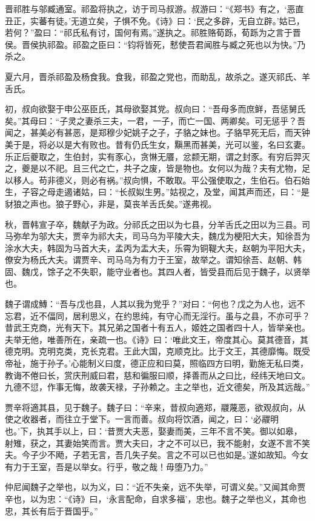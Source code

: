\documentclass[a4paper,12pt,UTF8,twoside]{ctexbook}
\begin{document}
晋祁胜与邬臧通室。祁盈将执之，访于司马叔游。叔游曰：“《郑书》有之，‘恶直丑正，实蕃有徒。’无道立矣，子惧不免。《诗》曰：‘民之多辟，无自立辟。’姑已，若何？”盈曰：“祁氏私有讨，国何有焉。”遂执之。祁胜赂荀跞，荀跞为之言于晋侯。晋侯执祁盈。祁盈之臣曰：“钧将皆死，慭使吾君闻胜与臧之死也以为快。”乃杀之。

夏六月，晋杀祁盈及杨食我。食我，祁盈之党也，而助乱，故杀之。遂灭祁氏、羊舌氏。

初，叔向欲娶于申公巫臣氏，其母欲娶其党。叔向曰：“吾母多而庶鲜，吾惩舅氏矣。”其母曰：“子灵之妻杀三夫，一君，一子，而亡一国、两卿矣。可无惩乎？吾闻之，甚美必有甚恶，是郑穆少妃姚子之子，子貉之妹也。子貉早死无后，而天钟美于是，将必以是大有败也。昔有仍氏生女，黰黑而甚美，光可以鉴，名曰玄妻。乐正后夔取之，生伯封，实有豕心，贪惏无餍，忿颣无期，谓之封豕。有穷后羿灭之，夔是以不祀。且三代之亡，共子之废，皆是物也。女何以为哉？夫有尤物，足以移人。苟非德义，则必有祸。”叔向惧，不敢取。平公强使取之，生伯石。伯石始生，子容之母走遏诸姑，曰：“长叔姒生男。”姑视之，及堂，闻其声而还，曰：“是豺狼之声也。狼子野心，非是，莫丧羊舌氏矣。”遂弗视。

秋，晋韩宣子卒，魏献子为政。分祁氏之田以为七县，分羊舌氏之田以为三县。司马弥牟为邬大夫，贾辛为祁大夫，司马乌为平陵大夫，魏戊为梗阳大夫，知徐吾为涂水大夫，韩固为马首大夫，孟丙为盂大夫，乐霄为铜鞮大夫，赵朝为平阳大夫，僚安为杨氏大夫。谓贾辛、司马乌为有力于王室，故举之。谓知徐吾、赵朝、韩固、魏戊，馀子之不失职，能守业者也。其四人者，皆受县而后见于魏子，以贤举也。

魏子谓成鱄：“吾与戊也县，人其以我为党乎？”对曰：“何也？戊之为人也，远不忘君，近不偪同，居利思义，在约思纯，有守心而无淫行。虽与之县，不亦可乎？昔武王克商，光有天下。其兄弟之国者十有五人，姬姓之国者四十人，皆举亲也。夫举无他，唯善所在，亲疏一也。《诗》曰：‘唯此文王，帝度其心。莫其德音，其德克明。克明克类，克长克君。王此大国，克顺克比。比于文王，其德靡悔。既受帝祉，施于孙子。’心能制义曰度，德正应和曰莫，照临四方曰明，勤施无私曰类，教诲不倦曰长，赏庆刑威曰君，慈和徧服曰顺，择善而从之曰比，经纬天地曰文。九德不愆，作事无悔，故袭天禄，子孙赖之。主之举也，近文德矣，所及其远哉。”

贾辛将適其县，见于魏子。魏子曰：“辛来，昔叔向適郑，鬷蔑恶，欲观叔向，从使之收器者，而往立于堂下。一言而善。叔向将饮酒，闻之，曰：‘必鬷明也。’下，执其手以上，曰：‘昔贾大夫恶，娶妻而美，三年不言不笑。御以如皋，射雉，获之，其妻始笑而言。贾大夫曰，才之不可以已，我不能射，女遂不言不笑夫。今子少不飏，子若无言，吾几失子矣。言之不可以已也如是。’遂如故知。今女有力于王室，吾是以举女。行乎，敬之哉！毋堕乃力。”

仲尼闻魏子之举也，以为义，曰：“近不失亲，远不失举，可谓义矣。”又闻其命贾辛也，以为忠：“《诗》曰，‘永言配命，自求多福’，忠也。魏子之举也义，其命也忠，其长有后于晋国乎。”
\end{document}

